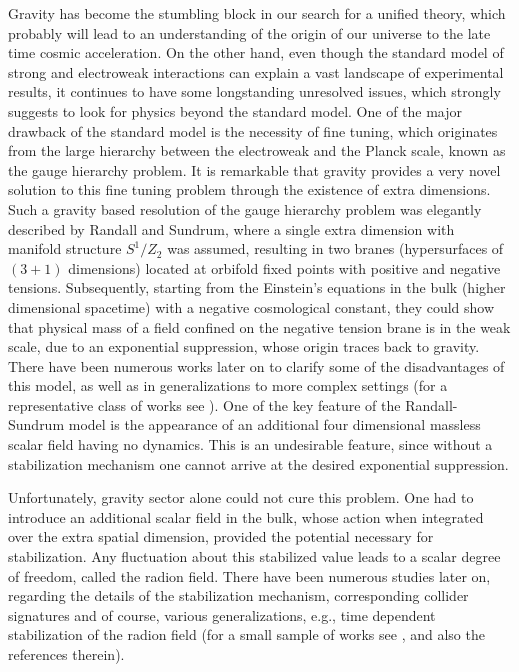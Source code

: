 \documentclass{article}
\begin{document}
Gravity has become the stumbling block in our search for a unified theory, which probably will lead to an understanding of the origin of our universe to the late time cosmic acceleration. On the other hand, even though the standard model of strong and electroweak interactions can explain a vast landscape of experimental results, it continues to have some longstanding unresolved issues, which strongly suggests to look for physics beyond the standard model. One of the major drawback of the standard model is the necessity of fine tuning, which originates from the large hierarchy between the electroweak and the Planck scale, known as the gauge hierarchy problem. It is remarkable that gravity provides a very novel solution to this fine tuning problem through the existence of extra dimensions. Such a gravity based resolution of the gauge hierarchy problem was elegantly described by Randall and Sundrum, where a single extra dimension with manifold structure $S^{1}/Z_{2}$ was 
assumed, resulting in two branes (hypersurfaces of $(3+1)$ dimensions) located at orbifold fixed points with positive and negative tensions. Subsequently, starting from the Einstein's equations in the bulk (higher dimensional spacetime) with a negative cosmological constant, they could show that physical mass of a field confined on the negative tension brane is in the weak scale, due to an exponential suppression, whose origin traces back to gravity. There have been numerous works later on to clarify some of the disadvantages of this model, as well as in generalizations to more complex settings (for a representative class of works see \cite{Randall:1999ee,Verlinde:1999fy,Djouadi:2005gi,Garriga:1999yh,Dadhich:2000am,Csaki:1999jh,Chacko:1999eb,Cohen:1999ia,
Antoniadis:1998ig,Rubakov:1983bb,Chung:1999zs,Cline:1999ts,Nihei:1999mt}). One of the key feature of the Randall-Sundrum model is the appearance of an additional four dimensional massless scalar field having no dynamics. This is an undesirable feature, since without a stabilization mechanism one cannot arrive at the desired exponential suppression.

Unfortunately, gravity sector alone could not cure this problem. One had to introduce an additional scalar field in the bulk, whose action when integrated over the extra spatial dimension, provided the potential necessary for stabilization. Any fluctuation about this stabilized value leads to a scalar degree of freedom, called the radion field. There have been numerous studies later on, regarding the details of the stabilization mechanism, corresponding collider signatures and of course, various generalizations, e.g., time dependent stabilization of the radion field (for a small sample of works see \cite{Goldberger:1999uk,Goldberger:1999un,Lipatov:2016ayn,Das:2016dtz,Arun:2016csq,Bazeia:2014dea,Cox:2013rva,Anand:2014vqa,
Chakraborty:2015zxc,Chakraborty:2013ipa}, and also the references therein).  
\end{document}
